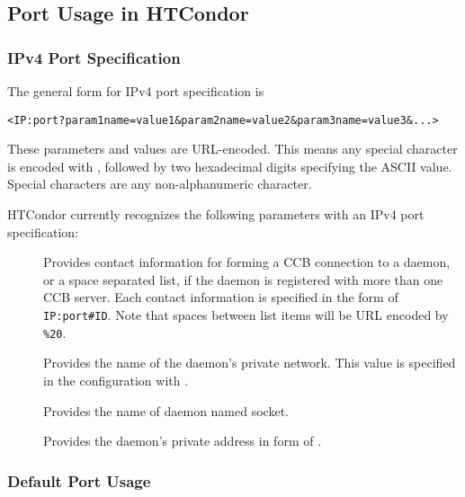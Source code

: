 \subsection{\label{sec:Port-Details}Port Usage in HTCondor}

\subsubsection{\label{sec:IPv4-Port-Specification}IPv4 Port Specification}
The general form for IPv4 port specification is 
\begin{verbatim}
<IP:port?param1name=value1&param2name=value2&param3name=value3&...> 
\end{verbatim}

These parameters and values are URL-encoded.
This means any special character is encoded with \Percent,
followed by two hexadecimal digits specifying the ASCII value.
Special characters are any non-alphanumeric character. 

HTCondor currently recognizes the following parameters with an
IPv4 port specification:
\begin{description}
\item[]
  Provides contact information for forming a CCB connection to a daemon, 
  or a space separated list, if the daemon is registered with more than 
  one CCB server.
  Each contact information is specified in the form of \verb|IP:port#ID|.
  Note that spaces between list items will be URL encoded by \verb|%20|.
\item[]
  Provides the name of the daemon's private network.
  This value is specified in the configuration with 
  .
\item[]
  Provides the name of  daemon named socket.
\item[]
  Provides the daemon's private address in form of
  .
\end{description}

\subsubsection{\label{sec:Ports-Standard}Default Port Usage}

